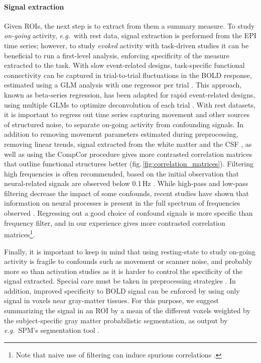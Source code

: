 \documentclass[5p]{elsarticle}
\begin{document}
\paragraph{Signal extraction}
%
Given ROIs, the next step is to extract from them a summary measure. To
study \emph{on-going} activity, \emph{e.g.}\ with rest data, signal
extraction is performed from the EPI time series; however, to study
\emph{evoked} activity with task-driven studies it can be beneficial to
run a first-level analysis, enforcing specificity of the measure
extracted to the task. With slow event-related designs, task-specific
functional connectivity can be captured in trial-to-trial fluctuations in
the BOLD response, estimated using a GLM analysis with one regressor per
trial \cite{grillon2012,rissman2004}. This approach, known as beta-series
regression, has been adapted for rapid event-related designs, using
multiple GLMs to optimize deconvolution of each trial \cite{mumford2012}.
With rest datasets, it is important to regress out time series capturing
movement and other sources of structured noise, to separate on-going
activity from confounding signals. In addition to removing movement
parameters estimated during preprocessing, removing linear trends, signal
extracted from the white matter and the CSF \cite{chang2009}, as well as
using the CompCor \cite{behzadi2007} procedure gives more contrasted
correlation matrices that outline functional structures better
(fig.\,\ref{fig:correlation_matrices}). Filtering high frequencies is
often recommended, based on the initial observation that neural-related
signals are observed below 0.1\,Hz \cite{cordes2001,biswal1995}. While
high-pass and low-pass filtering decrease the impact of some confounds,
recent studies have shown that information on neural processes is present
in the full spectrum of frequencies observed
\cite{smith2012,vanoort2012}. Regressing out a good choice of confound
signals is more specific than frequency filter, and in our experience
gives more contrasted correlation matrices\footnote{Note that naive use
of filtering can induce spurious correlations \cite{davey2012}.}.

Finally, it is important to keep in mind that using resting-state to
study on-going activity is fragile to confounds such as movement
\cite{vandijk2012,power2011} or scanner noise, and probably more so than
activation studies as it is harder to control the specificity of the
signal extracted. Special care must be taken in preprocessing strategies
\cite{vandijk2010,satterthwaite2012}.
%
In addition, improved specificity to BOLD signal can be enforced by
using only signal in voxels near gray-matter tissues. For this purpose,
we suggest summarizing the signal in an ROI by a mean of the different voxels
weighted by the subject-specific gray matter probabilistic segmentation,
as output by \emph{e.g.}\ SPM's segmentation tool \cite{ashburner2005}.
\end{document}
